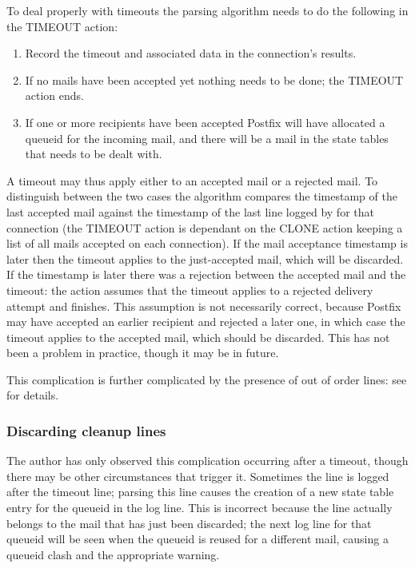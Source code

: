 To deal properly with timeouts the parsing algorithm needs to do the
following in the TIMEOUT action:

\begin{enumerate}

    \item Record the timeout and associated data in the connection's
        results.

    \item If no mails have been accepted yet nothing needs to be done; the
        TIMEOUT action ends.  

    \item If one or more recipients have been accepted Postfix will have
        allocated a queueid for the incoming mail, and there will be a mail
        in the state tables that needs to be dealt with.

\end{enumerate}

A timeout may thus apply either to an accepted mail or a rejected mail.  To
distinguish between the two cases the algorithm compares the timestamp of
the last accepted mail against the timestamp of the last line logged by
 for that connection (the TIMEOUT action is dependant on the
CLONE action keeping a list of all mails accepted on each connection).  If
the mail acceptance timestamp is later then the timeout applies to the
just-accepted mail, which will be discarded.  If the 
timestamp is later there was a rejection between the accepted mail and the
timeout: the action assumes that the timeout applies to a rejected delivery
attempt and finishes.  This assumption is not necessarily correct, because
Postfix may have accepted an earlier recipient and rejected a later one, in
which case the timeout applies to the accepted mail, which should be
discarded.  This has not been a problem in practice, though it may be in
future.

This complication is further complicated by the presence of out of order
 lines: see  for
details.

\subsubsection{Discarding cleanup lines}

\label{discarding cleanup lines}

The author has only observed this complication occurring after a timeout,
though there may be other circumstances that trigger it.  Sometimes the
 line is logged after the timeout line; parsing this line
causes the creation of a new state table entry for the queueid in the log
line.  This is incorrect because the line actually belongs to the mail
that has just been discarded; the next log line for that queueid will be
seen when the queueid is reused for a different mail, causing a queueid
clash and the appropriate warning.

